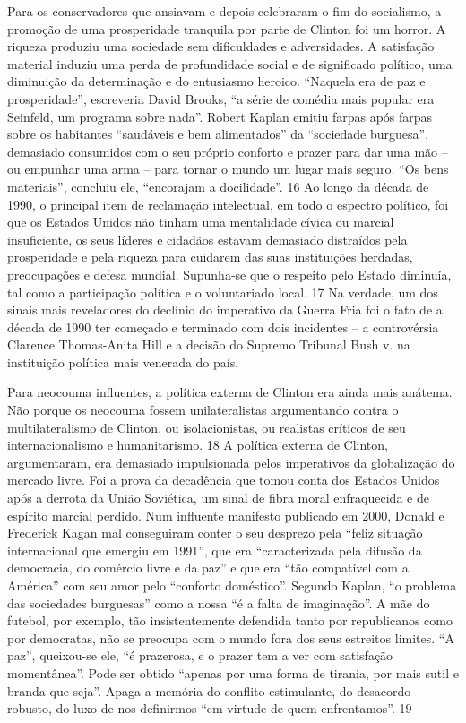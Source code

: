 Para os conservadores que ansiavam e depois celebraram o fim do socialismo, a promoção de uma prosperidade tranquila por parte de Clinton foi um horror. A riqueza produziu uma sociedade sem dificuldades e adversidades. A satisfação material induziu uma perda de profundidade social e de significado político, uma diminuição da determinação e do entusiasmo heroico. “Naquela era de paz e prosperidade”, escreveria David Brooks, “a série de comédia mais popular era Seinfeld, um programa sobre nada”. Robert Kaplan emitiu farpas após farpas sobre os habitantes “saudáveis ​​e bem alimentados” da “sociedade burguesa”, demasiado consumidos com o seu próprio conforto e prazer para dar uma mão – ou empunhar uma arma – para tornar o mundo um lugar mais seguro. “Os bens materiais”, concluiu ele, “encorajam a docilidade”.
 {\color{blue} 16}  
Ao longo da década de 1990, o principal item de reclamação intelectual, em todo o espectro político, foi que os Estados Unidos não tinham uma mentalidade cívica ou marcial insuficiente, os seus líderes e cidadãos estavam demasiado distraídos pela prosperidade e pela riqueza para cuidarem das suas instituições herdadas, preocupações e defesa mundial. Supunha-se que o respeito pelo Estado diminuía, tal como a participação política e o voluntariado local.
 {\color{blue} 17}  
Na verdade, um dos sinais mais reveladores do declínio do imperativo da Guerra Fria foi o fato de a década de 1990 ter começado e terminado com dois incidentes – a controvérsia Clarence Thomas-Anita Hill e a decisão do Supremo Tribunal Bush v. na instituição política mais venerada do país.
 
\par
 
Para neocouma influentes, a política externa de Clinton era ainda mais anátema. Não porque os neocouma fossem unilateralistas argumentando contra o multilateralismo de Clinton, ou isolacionistas, ou realistas críticos de seu internacionalismo e humanitarismo.
 {\color{blue} 18}  
A política externa de Clinton, argumentaram, era demasiado impulsionada pelos imperativos da globalização do mercado livre. Foi a prova da decadência que tomou conta dos Estados Unidos após a derrota da União Soviética, um sinal de fibra moral enfraquecida e de espírito marcial perdido. Num influente manifesto publicado em 2000, Donald e Frederick Kagan mal conseguiram conter o seu desprezo pela “feliz situação internacional que emergiu em 1991”, que era “caracterizada pela difusão da democracia, do comércio livre e da paz” e que era “tão compatível com a América” com seu amor pelo “conforto doméstico”. Segundo Kaplan, “o problema das sociedades burguesas” como a nossa “é a falta de imaginação”. A mãe do futebol, por exemplo, tão insistentemente defendida tanto por republicanos como por democratas, não se preocupa com o mundo fora dos seus estreitos limites. “A paz”, queixou-se ele, “é prazerosa, e o prazer tem a ver com satisfação momentânea”. Pode ser obtido “apenas por uma forma de tirania, por mais sutil e branda que seja”. Apaga a memória do conflito estimulante, do desacordo robusto, do luxo de nos definirmos “em virtude de quem enfrentamos”.
 {\color{blue} 19}  

